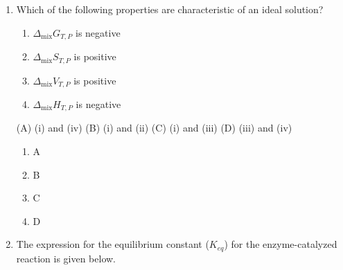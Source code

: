 \documentclass[journal,12pt,onecolumn]{exam}
\theoremstyle{remark}
\begin{document}
\begin{enumerate}
 



\item
Which of the following properties are characteristic of an ideal solution?

\begin{enumerate}
    \item[(i)] $\Delta_\text{mix} G_{T,P}$ is negative
    \item[(ii)] $\Delta_\text{mix} S_{T,P}$ is positive
    \item[(iii)] $\Delta_\text{mix} V_{T,P}$ is positive
    \item[(iv)] $\Delta_\text{mix} H_{T,P}$ is negative
\end{enumerate}

(A) (i) and (iv) \quad (B) (i) and (ii) \quad (C) (i) and (iii) \quad (D) (iii) and (iv)

\hfill{}

 

\begin{multicols}{2}
\begin{enumerate}
    \item \textcolor{red}{} A
    \item \textcolor{green}{\checkmark} B
    \item \textcolor{red}{} C
    \item \textcolor{red}{} D
\end{enumerate}
\end{multicols}

 

\item
The expression for the equilibrium constant ($K_{eq}$) for the enzyme-catalyzed reaction is given below.

\begin{center}
\end{center}

\hfill{}


\end{enumerate}
\end{document}
